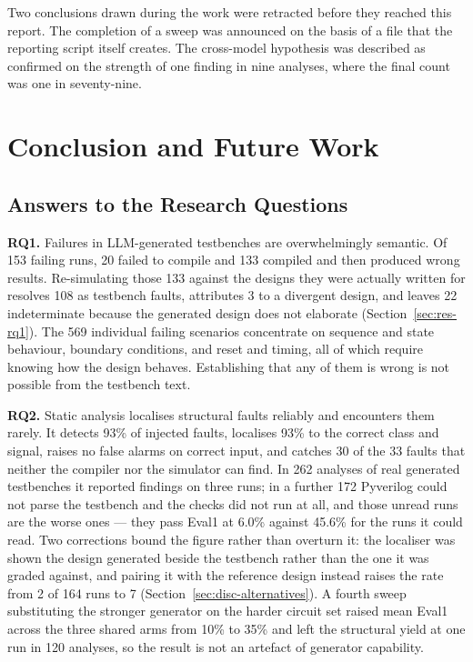 \documentclass[11pt,a4paper,titlepage=false]{scrreprt}
\begin{document}
Two conclusions drawn during the work were retracted before they reached this report. The
completion of a sweep was announced on the basis of a file that the reporting script itself
creates. The cross-model hypothesis was described as confirmed on the strength of one
finding in nine analyses, where the final count was one in seventy-nine.

\chapter{Conclusion and Future Work}\label{ch:conclusion}

\section{Answers to the Research Questions}\label{sec:concl-rq}

\textbf{RQ1.} Failures in LLM-generated testbenches are overwhelmingly semantic. Of 153
failing runs, 20 failed to compile and 133 compiled and then produced wrong results.
Re-simulating those 133 against the designs they were actually written for resolves 108 as
testbench faults, attributes 3 to a divergent design, and leaves 22 indeterminate because
the generated design does not elaborate (Section~\ref{sec:res-rq1}). The 569
individual failing scenarios concentrate on sequence and state behaviour, boundary
conditions, and reset and timing, all of which require knowing how the design behaves.
Establishing that any of them is wrong is not possible from the testbench text.

\textbf{RQ2.} Static analysis localises structural faults reliably and encounters them
rarely. It detects 93\% of injected faults, localises 93\% to the correct class and signal,
raises no false alarms on correct input, and catches 30 of the 33 faults that neither the
compiler nor the simulator can find. In 262 analyses of real generated testbenches it
reported findings on three runs; in a further 172 Pyverilog could not parse the testbench and
the checks did not run at all, and those unread runs are the worse ones --- they pass Eval1 at
6.0\% against 45.6\% for the runs it could read. Two corrections bound the figure rather than
overturn it: the localiser was shown the design generated beside the testbench rather than the
one it was graded against, and pairing it with the reference design instead raises the rate
from 2 of 164 runs to 7 (Section~\ref{sec:disc-alternatives}). A fourth sweep substituting the stronger generator on the
harder circuit set raised mean Eval1 across the three shared arms from 10\% to 35\% and left
the structural yield at one run in 120 analyses,
so the result is not an artefact of generator capability.
\end{document}
